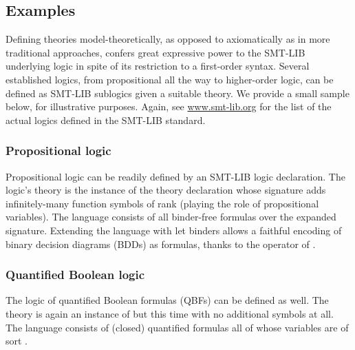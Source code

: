 \subsection{Examples}

Defining theories model-theoretically, as opposed to axiomatically 
as in more traditional approaches, confers great expressive power 
to the SMT-LIB underlying logic in spite of its restriction 
to a first-order syntax.
Several established logics, from propositional all the way to higher-order logic, 
can be defined as SMT-LIB sublogics given a suitable theory.
We provide a small sample below, for illustrative purposes.
Again, see \href{http://www.smt-lib.org}{www.smt-lib.org} for the list 
of the actual logics defined in the SMT-LIB standard. 



\subsubsection*{Propositional logic}

Propositional logic can be readily defined by an SMT-LIB logic declaration.
The logic's theory is the instance of the  theory declaration
whose signature adds infinitely-many function symbols of rank 
(playing the role of propositional variables).
The language consists of all binder-free formulas over the expanded signature.
Extending the language with let binders
allows a faithful encoding of binary decision diagrams (BDDs) as formulas,
thanks to the  operator of .

\subsubsection*{Quantified Boolean logic}

The logic of quantified Boolean formulas (QBFs) can be defined as well.
The theory is again an instance of 
but this time with no additional symbols at all.
The language consists of (closed) quantified formulas
all of whose variables are of sort .

